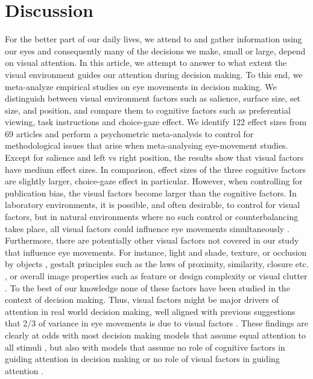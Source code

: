 
\section{Discussion}

For the better part of our daily lives, we attend to and gather information using our eyes and consequently many of the decisions we make, small or large, depend on visual attention. In this article, we attempt to answer to what extent the visual environment guides our attention during decision making. To this end, we meta-analyze empirical studies on eye movements in decision making. We distinguish between visual environment factors such as salience, surface size, set size, and position, and compare them to cognitive factors such as preferential viewing, task instructions and choice-gaze effect. We identify 122 effect sizes from 69 articles and perform a psychometric meta-analysis to control for methodological issues that arise when meta-analysing eye-movement studies.\\ 

Except for salience and left vs right position, the results show that visual factors have medium effect sizes. In comparison, effect sizes of the three cognitive factors are slightly larger, choice-gaze effect in particular. However, when controlling for publication bias, the visual factors become larger than the cognitive factors. In laboratory environments, it is possible, and often desirable, to control for visual factors, but in natural environments where no such control or counterbalancing takes place, all visual factors could influence eye movements simultaneously \citep{gidloef2017a, orquin2019a}. Furthermore, there are potentially other visual factors not covered in our study that influence eye movements. For instance, light and shade, texture, or occlusion by objects \citep{geisler2008}, gestalt principles such as the laws of proximity, similarity, closure etc. \citep{wagemans2012}, or overall image properties such as feature or design complexity \citep{pieters2010a} or visual clutter \citep{rosenholtz2007a}. To the best of our knowledge none of these factors have been studied in the context of decision making. Thus, visual factors might be major drivers of attention in real world decision making, well aligned with previous suggestions that 2/3 of variance in eye movements is due to visual factors \citep{vanderlans2008}. These findings are clearly at odds with most decision making models that assume equal attention to all stimuli \citep{tversky1979,payne1988, simon1956a}, but also with models that assume no role of cognitive factors in guiding attention in decision making \citep{busemeyer1992, krajbich2010a} or no role of visual factors in guiding attention \citep{callaway2019a, gloeckner2011a, gluth2018, gluth2020}.\\ 

